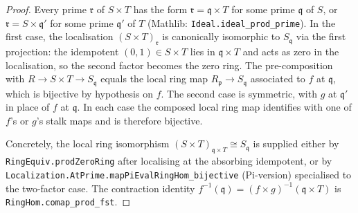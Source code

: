 \begin{proof}
  \leanok
  Every prime $\mathfrak r$ of $S \times T$ has the form
  $\mathfrak r = \mathfrak q \times T$ for some prime $\mathfrak q$
  of $S$, or $\mathfrak r = S \times \mathfrak q'$ for some prime
  $\mathfrak q'$ of $T$ (Mathlib: \texttt{Ideal.ideal\_prod\_prime}).
  In the first case, the localisation $(S \times T)_{\mathfrak r}$
  is canonically isomorphic to $S_{\mathfrak q}$ via the first
  projection: the idempotent $(0, 1) \in S \times T$ lies in
  $\mathfrak q \times T$ and acts as zero in the localisation, so
  the second factor becomes the zero ring. The pre-composition with
  $R \to S \times T \to S_{\mathfrak q}$ equals the local ring map
  $R_{\mathfrak p} \to S_{\mathfrak q}$ associated to $f$ at
  $\mathfrak q$, which is bijective by hypothesis on $f$. The
  second case is symmetric, with $g$ at $\mathfrak q'$ in place of
  $f$ at $\mathfrak q$. In each case the composed local ring map
  identifies with one of $f$'s or $g$'s stalk maps and is therefore
  bijective.

  Concretely, the local ring isomorphism
  $(S \times T)_{\mathfrak q \times T} \cong S_{\mathfrak q}$ is
  supplied either by \texttt{RingEquiv.prodZeroRing} after
  localising at the absorbing idempotent, or by
  \texttt{Localization.AtPrime.mapPiEvalRingHom\_bijective}
  (Pi-version) specialised to the two-factor case. The contraction
  identity $f^{-1}(\mathfrak q) = (f \times g)^{-1}(\mathfrak q
  \times T)$ is \texttt{RingHom.comap\_prod\_fst}.
\end{proof}
